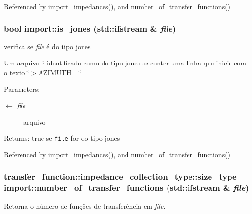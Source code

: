 Referenced by import\_\-impedances(), and number\_\-of\_\-transfer\_\-functions().
\subsubsection{\setlength{\rightskip}{0pt plus 5cm}bool import::is\_\-jones (std::ifstream \& {\em file})}\label{namespaceimport_324200f4b44890acf4bb90483d663ddb}


verifica se {\em file\/} é do tipo jones 

Um arquivo é identificado como do tipo jones se conter uma linha que inicie com o texto \char`\"{}$>$AZIMUTH =\char`\"{}

\begin{Desc}
\item[Parameters:]
\begin{description}
\item[\mbox{$\leftarrow$} {\em file}]arquivo\end{description}
\end{Desc}
\begin{Desc}
\item[Returns:]true se {\tt file} for do tipo jones \end{Desc}


Referenced by import\_\-impedances(), and number\_\-of\_\-transfer\_\-functions().
\subsubsection{\setlength{\rightskip}{0pt plus 5cm}transfer\_\-function::impedance\_\-collection\_\-type::size\_\-type import::number\_\-of\_\-transfer\_\-functions (std::ifstream \& {\em file})}\label{namespaceimport_57b67112e3fbc0d5dfd7cffb22b0beae}


Retorna o número de funções de transferência em {\em file\/}. 

